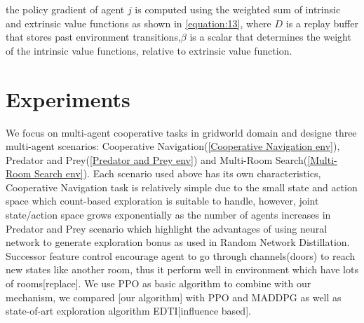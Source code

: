 \documentclass{article} %
\begin{document}
the policy gradient of agent $j$ is computed using the weighted sum of intrinsic and extrinsic value functions as shown in \ref{equation:13}, where $D$ is a replay buffer that stores past environment transitions,$\beta$ is a scalar that determines the weight of the intrinsic value functions, relative to extrinsic value function.
\fi

\section{Experiments}
We focus on multi-agent cooperative tasks in gridworld domain and designe three multi-agent scenarios: Cooperative Navigation(\ref{Cooperative Navigation env}), Predator and Prey(\ref{Predator and Prey env}) and Multi-Room Search(\ref{Multi-Room Search env}). Each scenario used above has its own characteristics, Cooperative Navigation task is relatively simple due to the small state and action space which count-based exploration is suitable to handle, however, joint state/action space grows exponentially as the number of agents increases in Predator and Prey scenario which highlight the advantages of using neural network to generate exploration bonus as used in Random Network Distillation. Successor feature control encourage agent to go through channels(doors) to reach new states like another room, thus it perform well in environment which have lots of rooms[replace]. We use PPO as basic algorithm to combine with our mechanism, we compared [our algorithm] with PPO and MADDPG as well as state-of-art exploration algorithm EDTI[influence based]. 
\end{document}
